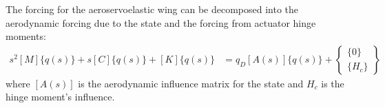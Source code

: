 The forcing for the aeroservoelastic wing can be decomposed into the aerodynamic forcing due to the state and the forcing from actuator hinge moments:
\begin{align}
    s^2 [M] \{q(s)\} + s [C] \{q(s)\} + [K] \{q(s)\} &= q_D [A(s)] \{q(s)\} + \begin{Bmatrix} \{0\} \\ \{H_c\} \end{Bmatrix}
\end{align}
where $[A(s)]$ is the aerodynamic influence matrix for the state and ${H_c}$ is the hinge moment's influence.

